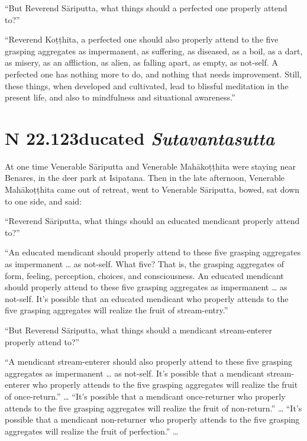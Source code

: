 \documentclass[12pt,openany]{book}%
\newcommand*{\suttatitleacronym}[1]{\smaller[2]{#1}\vspace*{.3em}}
\newcommand*{\suttatitletranslation}[1]{\linebreak{#1}}
\newcommand*{\suttatitleroot}[1]{\linebreak\smaller[2]\itshape{#1}}
\newcommand*{\tocacronym}[1]{\hspace*{-3.3em}{#1}\quad}
\newcommand*{\toctranslation}[1]{#1}
\newcommand*{\tocroot}[1]{(\textit{#1})}
\begin{document}
“But Reverend \textsanskrit{Sāriputta}, what things should a perfected one properly attend to?” 

“Reverend \textsanskrit{Koṭṭhita}, a perfected one should also properly attend to the five grasping aggregates as impermanent, as suffering, as diseased, as a boil, as a dart, as misery, as an affliction, as alien, as falling apart, as empty, as not-self. A perfected one has nothing more to do, and nothing that needs improvement. Still, these things, when developed and cultivated, lead to blissful meditation in the present life, and also to mindfulness and situational awareness.” 

%
\section*{{\suttatitleacronym SN 22.123}{\suttatitletranslation Educated }{\suttatitleroot Sutavantasutta}}
\addcontentsline{toc}{section}{\tocacronym{SN 22.123} \toctranslation{Educated } \tocroot{Sutavantasutta}}

At one time Venerable \textsanskrit{Sāriputta} and Venerable \textsanskrit{Mahākoṭṭhita} were staying near Benares, in the deer park at Isipatana. Then in the late afternoon, Venerable \textsanskrit{Mahākoṭṭhita} came out of retreat, went to Venerable \textsanskrit{Sāriputta}, bowed, sat down to one side, and said: 

“Reverend \textsanskrit{Sāriputta}, what things should an educated mendicant properly attend to?” 

“An educated mendicant should properly attend to these five grasping aggregates as impermanent … as not-self. What five? That is, the grasping aggregates of form, feeling, perception, choices, and consciousness. An educated mendicant should properly attend to these five grasping aggregates as impermanent … as not-self. It’s possible that an educated mendicant who properly attends to the five grasping aggregates will realize the fruit of stream-entry.” 

“But Reverend \textsanskrit{Sāriputta}, what things should a mendicant stream-enterer properly attend to?” 

“A mendicant stream-enterer should also properly attend to these five grasping aggregates as impermanent … as not-self. It’s possible that a mendicant stream-enterer who properly attends to the five grasping aggregates will realize the fruit of once-return.” … “It’s possible that a mendicant once-returner who properly attends to the five grasping aggregates will realize the fruit of non-return.” … “It’s possible that a mendicant non-returner who properly attends to the five grasping aggregates will realize the fruit of perfection.” … 
\end{document}
